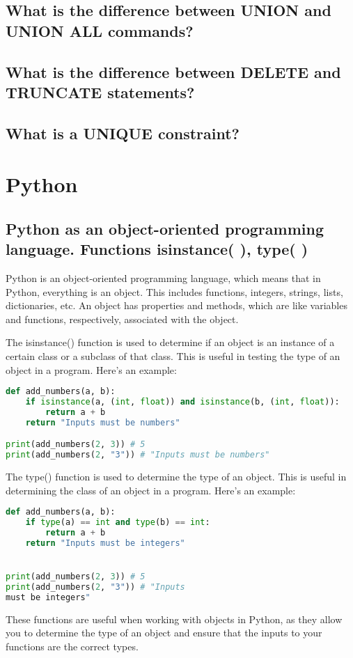 \documentclass[12pt, a4paper, oneside]{article}
\begin{document}
\subsection{ What is the difference between UNION and UNION ALL commands? }
\subsection{ What is the difference between DELETE and TRUNCATE statements? }
\subsection{ What is a UNIQUE constraint?   }
\section{Python}
\subsection{ Python as an object-oriented programming language. Functions isinstance( ), type( ) }
Python is an object-oriented programming language, which means that in Python, everything is an object. This includes functions, integers, strings, lists, dictionaries, etc. An object has properties and methods, which are like variables and functions, respectively, associated with the object.

The isinstance() function is used to determine if an object is an instance of a certain class or a subclass of that class. This is useful in testing the type of an object in a program. Here's an example:

\begin{lstlisting}[language=Python, frame=single]
def add_numbers(a, b):
    if isinstance(a, (int, float)) and isinstance(b, (int, float)):
        return a + b
    return "Inputs must be numbers"

print(add_numbers(2, 3)) # 5
print(add_numbers(2, "3")) # "Inputs must be numbers"
\end{lstlisting}
The type() function is used to determine the type of an object. This is useful in determining the class of an object in a program. Here's an example:

\begin{lstlisting}[language=Python, frame=single]
def add_numbers(a, b):
    if type(a) == int and type(b) == int:
        return a + b
    return "Inputs must be integers"


print(add_numbers(2, 3)) # 5
print(add_numbers(2, "3")) # "Inputs 
must be integers"
\end{lstlisting}
These functions are useful when working with objects in Python, as they allow you to determine the type of an object and ensure that the inputs to your functions are the correct types.
\end{document}
